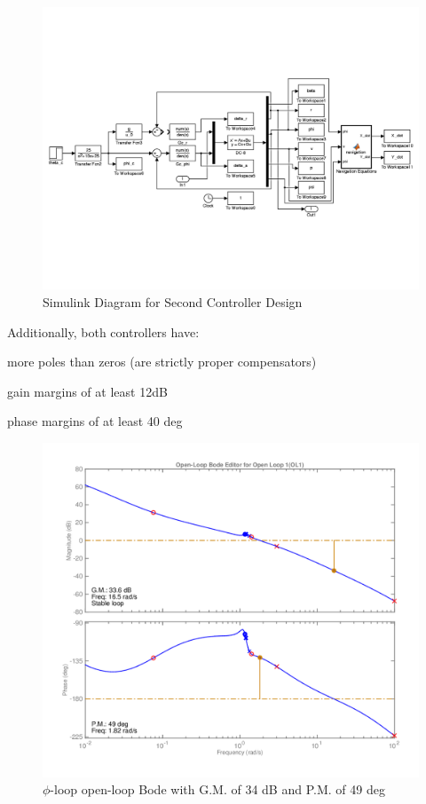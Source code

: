 \documentclass[12pt]{article}
\begin{document}
\begin{figure}[h!]
\begin{center}
\includegraphics[height=.425\textheight]{figures/second_controller_simulink}
\caption{Simulink Diagram for Second Controller Design}
\end{center}
\end{figure}

\noindent Additionally, both controllers have:

more poles than zeros (are strictly proper compensators)

gain margins of at least 12dB

phase margins of at least 40 deg

\clearpage
\begin{figure}[h!]
\begin{center}
\includegraphics[height=.435\textheight]{figures/phi_delta_a_open_loop}
\caption{$\phi$-loop open-loop Bode with G.M. of 34 dB and P.M. of 49 deg}
\end{center}
\end{figure}
\end{document}
